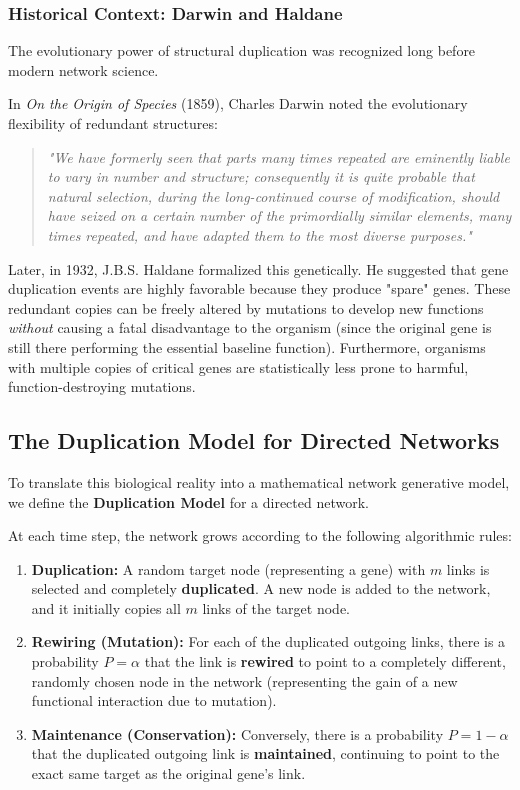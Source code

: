 \subsubsection{Historical Context: Darwin and Haldane}
The evolutionary power of structural duplication was recognized long before modern network science.

In \textit{On the Origin of Species} (1859), Charles Darwin noted the evolutionary flexibility of redundant structures:
\begin{quote}
    \textit{"We have formerly seen that parts many times repeated are eminently liable to vary in number and structure; consequently it is quite probable that natural selection, during the long-continued course of modification, should have seized on a certain number of the primordially similar elements, many times repeated, and have adapted them to the most diverse purposes."}
\end{quote}

Later, in 1932, J.B.S. Haldane formalized this genetically. He suggested that gene duplication events are highly favorable because they produce "spare" genes. These redundant copies can be freely altered by mutations to develop new functions \textit{without} causing a fatal disadvantage to the organism (since the original gene is still there performing the essential baseline function). Furthermore, organisms with multiple copies of critical genes are statistically less prone to harmful, function-destroying mutations.

\subsection{The Duplication Model for Directed Networks}
To translate this biological reality into a mathematical network generative model, we define the \textbf{Duplication Model} for a directed network.

At each time step, the network grows according to the following algorithmic rules:
\begin{enumerate}
    \item \textbf{Duplication:} A random target node (representing a gene) with \( m \) links is selected and completely \textbf{duplicated}. A new node is added to the network, and it initially copies all \( m \) links of the target node.
    \item \textbf{Rewiring (Mutation):} For each of the duplicated outgoing links, there is a probability \( P = \alpha \) that the link is \textbf{rewired} to point to a completely different, randomly chosen node in the network (representing the gain of a new functional interaction due to mutation).
    \item \textbf{Maintenance (Conservation):} Conversely, there is a probability \( P = 1 - \alpha \) that the duplicated outgoing link is \textbf{maintained}, continuing to point to the exact same target as the original gene's link.
\end{enumerate}

